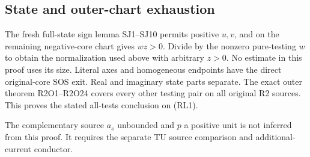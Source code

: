 \subsection{State and outer-chart exhaustion}

The fresh full-state sign lemma SJ1--SJ10 permits positive
\(u,v\), and on the remaining negative-core chart gives
\(wz>0\).  Divide by the nonzero pure-testing \(w\) to obtain
the normalization used above with arbitrary \(z>0\).
No estimate in this proof uses its size.  Literal axes and
homogeneous endpoints have the direct original-core SOS exit.
Real and imaginary state parts separate.
The exact outer theorem R2O1--R2O24 covers every other testing
pair on all original R2 sources.  This proves the stated
all-tests conclusion on (RL1).

The complementary source \(a_s\) unbounded and \(p\) a positive
unit is not inferred from this proof.  It requires the separate
TU source comparison and additional-current conductor.

